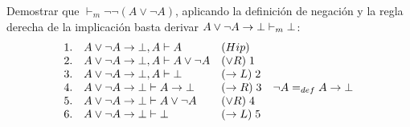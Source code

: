 \documentclass[11pt,letterpaper]{article}
\begin{document}
\item Demostrar que $\vdash_m\neg\neg(A\lor\neg A)$, aplicando la definición de 
negación y la regla derecha de la implicaci\'on basta derivar
$A\lor\neg A\imp \bot\vdash_m\bot$:
\[
\ba{rll}
1. & A\lor \neg A\imp\bot,A\vdash A & (Hip)\\
2. & A\lor \neg A\imp\bot,A\vdash A\lor\neg A & (\lor R)\;1\\
3. & A\lor \neg A\imp\bot,A\vdash \bot & (\imp L)\;2\\
4. & A\lor \neg A\imp\bot\vdash A\imp \bot & (\imp R)\;3 \quad \lnot 
A=_{def}A\to \bot\\
5. & A\lor \neg A\imp\bot\vdash A\lor \neg A & (\lor R)\;4\\
6. & A\lor \neg A\imp\bot\vdash \bot & (\imp L)\; 5\\
\ea
\]

\begin{comment}

\item Demostrar el siguiente teorema 
$\vdash_m \neg(A\lor B)\iff \neg A\land\neg B$. Hay que mostrar ambas 
implicaciones:
\be
\item $\vdash_m \neg(A\lor B)\imp \neg A\land\neg B$. Basta mostrar
$A\lor B\imp \bot,A\vdash_m\bot$ y $A\lor B\imp \bot,B\vdash_m\bot$.
\[
\ba{rll}
1. & A\lor B\imp\bot,A\vdash A & (Hip)\\
2. & A\lor B\imp\bot,A\vdash A\lor B & (\lor I)\;1\\
3. & A\lor B\imp\bot,A\vdash A\lor B\imp\bot & (Hip)\\
4. & A\lor B\imp\bot,A\vdash \bot & (\imp E)\;2,3\\
\ea
\]
La derivación faltante es análoga.




\item Para demostrar que $\vdash_m \neg A\land\neg B\imp \neg(A\lor B)$, basta 
mostrar $\neg A\land\neg B,A\lor B\vdash \bot$.
\[
\ba{rll}
1. & \neg A\land \neg B, A\lor B\vdash A\lor B & (Hip)\\
2. & \neg A\land \neg B, A\lor B,A\vdash \neg A\land\neg B & (Hip)\\
3. & \neg A\land \neg B, A\lor B,A\vdash A & (Hip)\\
4. & \neg A\land \neg B, A\lor B,A\vdash \neg A & (\land E)\;2\\
5. & \neg A\land \neg B, A\lor B,A\vdash \bot & (\imp E)\;3,4\\
6. & \neg A\land \neg B, A\lor B,B\vdash \neg A\land\neg B & (Hip)\\
7. & \neg A\land \neg B, A\lor B,B\vdash B & (Hip)\\
8. & \neg A\land \neg B, A\lor B,B\vdash \neg B & (\land E)\;6\\
9. & \neg A\land \neg B, A\lor B,B\vdash \bot & (\imp E)\;7,8\\
10. & \neg A\land \neg B, A\lor B\vdash \bot & (\lor E)\;1,5,9\\
\ea
\]
\ee

\end{comment}
\end{document}
